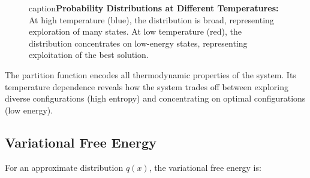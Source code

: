 \documentclass[12pt,a4paper]{article}
\begin{document}
\begin{figure}[htbp]
\centering
{}
caption{\textbf{Probability Distributions at Different Temperatures:} 
         At high temperature (blue), the distribution is broad, representing 
         exploration of many states. At low temperature (red), the 
         distribution concentrates on low-energy states, representing 
         exploitation of the best solution.}
\label{fig:distribution_temperature}
\end{figure}

The partition function encodes all thermodynamic properties of the system. Its temperature dependence reveals how the system trades off between exploring diverse configurations (high entropy) and concentrating on optimal configurations (low energy).

\subsection{Variational Free Energy}

For an approximate distribution $q(x)$, the variational free energy is:
\end{document}

